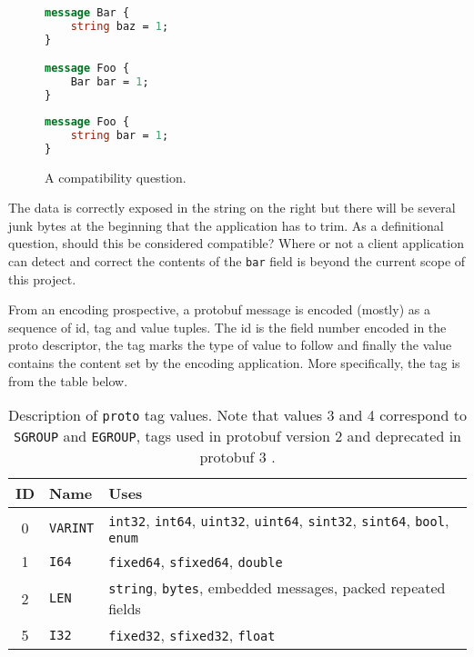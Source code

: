 \documentclass[11pt]{article}
\begin{document}
\begin{figure}[H]
	\centering
	\begin{minipage}[bt]{0.4\textwidth}
		\begin{lstlisting}[language=proto]
message Bar {
    string baz = 1;
}

message Foo {
    Bar bar = 1;
}\end{lstlisting}
	\end{minipage}
	\hspace{1cm}
	\begin{minipage}[bt]{0.4\textwidth}
		\begin{lstlisting}[language=proto]
message Foo {
    string bar = 1;
}\end{lstlisting}
	\end{minipage}

	\caption[]{A compatibility question.}
\end{figure}

The data is correctly exposed in the string on the right but there will be
several junk bytes at the beginning that the application has to trim. As a
definitional question, should this be considered compatible? Where or not a
client application can detect and correct the contents of the \texttt{bar} field
is beyond the current scope of this project.

From an encoding prospective, a protobuf message is encoded (mostly) as a
sequence of id, tag and value tuples. The id is the field number encoded in the
proto descriptor, the tag marks the type of value to follow and finally the
value contains the content set by the encoding application. More specifically,
the tag is from the table below.

\begin{table}[H]
	\centering
	\begin{tabular}{cll}
		\toprule
		ID & Name            & Uses                                                 \\
		\midrule
		0  & \texttt{VARINT} & \texttt{int32}, \texttt{int64}, \texttt{uint32},
		\texttt{uint64}, \texttt{sint32}, \texttt{sint64},
		\texttt{bool}, \texttt{enum}                                                \\
		1  & \texttt{I64}    & \texttt{fixed64}, \texttt{sfixed64}, \texttt{double} \\
		2  & \texttt{LEN}    & \texttt{string}, \texttt{bytes}, embedded messages,
		packed repeated fields                                                      \\
		5  & \texttt{I32}    & \texttt{fixed32}, \texttt{sfixed32},
		\texttt{float}                                                              \\
		\bottomrule
	\end{tabular}

	\vspace{4mm}
	\caption[]{Description of \texttt{proto} tag values. Note that values 3 and
		4 correspond to \texttt{SGROUP} and \texttt{EGROUP}, tags used in protobuf
		version 2 and deprecated in protobuf 3 \autocite{Encoding}.}
\end{table}
\end{document}

